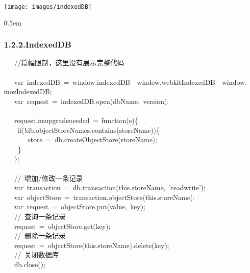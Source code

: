 \documentclass{article}
\begin{document}
\begin{mdcenter}%

\noindent{}\texttt{[image: images/indexedDB]}{}%
\end{mdcenter}%

\begin{mdbmargintb}{}{0.5em}%
\subsubsection{1.2.2.\hspace*{0.5em}IndexedDB}\label{sec-indexeddb}%
\end{mdbmargintb}%

\noindent{}%
\begin{mdpre}%
\noindent~~~{//篇幅限制，这里没有展示完整代码}\\
~~\\
~~~{var}~indexedDB~=~window.indexedDB~\textbar{}\textbar{}~window.webkitIndexedDB~\textbar{}\textbar{}~window.mozIndexedDB;\\
~~~{var}~request~=~indexedDB.open(dbName,~version);\\
~~~\\
~~~request.onupgradeneeded~=~{function}(e)\{\\
~~~~{if}(!db.objectStoreNames.contains(storeName))\{\\
~~~~~~~store~=~db.createObjectStore(storeName);\\
~~~~\}\\
~~~\};\\
~~~\\
~~~{//~增加/修改一条记录}\\
~~~{var}~transaction~=~db.transaction({this}.storeName,~{'}{readwrite}{'});\\
~~~{var}~objectStore~=~transaction.objectStore({this}.storeName);\\
~~~{var}~request~=~objectStore.put(value,~key);\\
~~~{//~查询一条记录}\\
~~~request~=~objectStore.get(key);\\
~~~{//~删除一条记录}\\
~~~request~=~objectStore({this}.storeName).{delete}(key);\\
~~~{//~关闭数据库}\\
~~~db.close();%
\end{mdpre}
\end{document}
